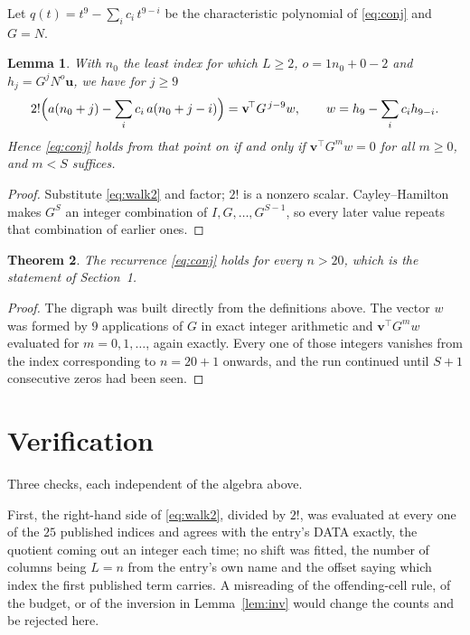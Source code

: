 \documentclass[11pt,a4paper]{article}
\theoremstyle{plain}
\newtheorem{theorem}{Theorem}
\newtheorem{lemma}[theorem]{Lemma}
\theoremstyle{definition}
\begin{document}
Let $q(t)=t^{9}-\sum_i c_i\,t^{9-i}$ be the characteristic polynomial of
\eqref{eq:conj} and $G=N$.

\begin{lemma}\label{lem:crit}
With $n_0$ the least index for which $L\ge2$, $o=1n_0+0-2$ and
$h_j=G^{j}N^{o}\mathbf{u}$, we have for $j\ge9$
\[
2!\Bigl(a(n_0+j)-\sum_i c_i\,a(n_0+j-i)\Bigr)=\mathbf{v}^{\!\top}G^{\,j-9}w,
\qquad w=h_{9}-\sum_i c_i h_{9-i} .
\]
Hence \eqref{eq:conj} holds from that point on if and only if
$\mathbf{v}^{\!\top}G^{m}w=0$ for all $m\ge0$, and $m<S$ suffices.
\end{lemma}

\begin{proof}
Substitute \eqref{eq:walk2} and factor; $2!$ is a nonzero scalar. Cayley--Hamilton
makes $G^{S}$ an integer combination of $I,G,\dots,G^{S-1}$, so every later value repeats
that combination of earlier ones.
\end{proof}

\begin{theorem}
The recurrence \eqref{eq:conj} holds for every $n>20$, which is the statement of
Section~1.
\end{theorem}

\begin{proof}
The digraph was built directly from the definitions above. The vector $w$ was formed by
$9$ applications of $G$ in exact integer arithmetic and $\mathbf{v}^{\!\top}G^{m}w$
evaluated for $m=0,1,\dots$, again exactly. Every one of those integers vanishes from the
index corresponding to $n=20+1$ onwards, and the run continued until $S+1$ consecutive
zeros had been seen.
\end{proof}

\section{Verification}

Three checks, each independent of the algebra above.

First, the right-hand side of \eqref{eq:walk2}, divided by $2!$, was evaluated at every
one of the $25$ published indices and agrees with the entry's DATA exactly, the quotient
coming out an integer each time; no shift was fitted, the number of columns being
$L=n$ from the entry's own name and the offset saying which index the first published
term carries. A misreading of the offending-cell rule, of the budget, or of the inversion in
Lemma~\ref{lem:inv} would change the counts and be rejected here.
\end{document}
